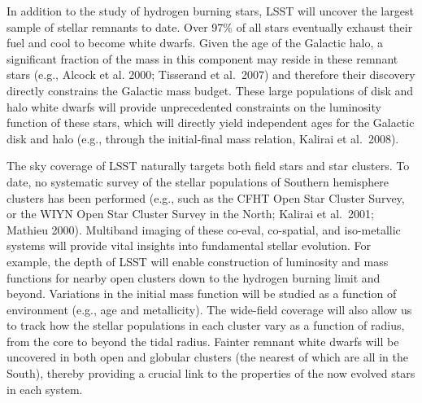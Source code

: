 
In addition to the study of hydrogen burning stars, LSST will uncover the largest sample of stellar remnants to date.
Over 97\% of all stars eventually exhaust their fuel and cool to become white dwarfs. Given the age of the Galactic
halo, a significant fraction of the mass in this component may reside in these remnant stars (e.g., Alcock et al.
2000; Tisserand et al.~2007) and therefore their discovery directly constrains the Galactic mass budget.  These large
populations of disk and halo white dwarfs will provide unprecedented constraints on the luminosity function of
these stars, which will directly yield independent ages for the Galactic disk and halo (e.g., through the initial-final mass
relation, Kalirai et al.~2008).

The sky coverage of LSST naturally targets both field stars and star clusters.  To date, no systematic survey of the stellar
populations of Southern hemisphere clusters has been performed (e.g., such as the CFHT Open Star Cluster Survey, or
the WIYN Open Star Cluster Survey in the North; Kalirai et al.~2001; Mathieu 2000).  Multiband imaging of these co-eval,
co-spatial, and iso-metallic systems will provide vital insights into fundamental stellar evolution.  For example, the depth
of LSST will enable construction of  luminosity and mass functions for nearby open clusters down to the hydrogen burning
limit and beyond.  Variations in the initial mass function will be studied as a function of environment (e.g., age and metallicity).
The wide-field coverage will also allow us to track how the stellar populations in each cluster vary as a function of radius,
from the core to beyond the tidal radius. Fainter remnant white dwarfs will be uncovered in both open and globular clusters
(the nearest of which are all in the South), thereby providing a crucial link to the properties of the now evolved stars in each
system.



